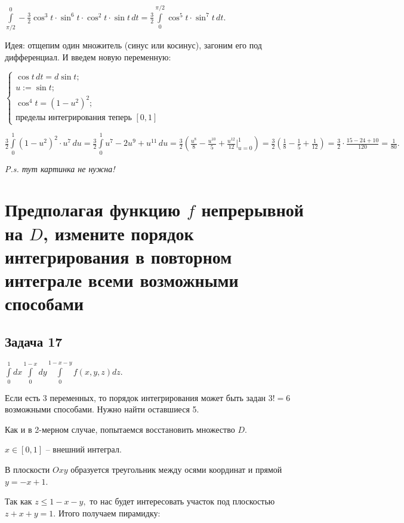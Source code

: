 \documentclass[a4paper, fleqn]{article}
\begin{document}
     $\int\limits_{\pi/2}^{0} -\frac{3}{2} \cos^3 t \cdot \sin^6 t \cdot \cos^2 t \cdot \sin t \, dt = \frac{3}{2} \int\limits_{0}^{\pi/ 2} \cos^5 t\cdot \sin^7 t \, dt.$
     
     Идея: отщепим один множитель (синус или косинус), загоним его под дифференциал. И введем новую переменную:
     
     $\begin{cases}
     \cos t \,dt = d \sin t;\\
     u := \sin t;\\
     \cos ^ 4 t = (1 - u^2)^2;\\
     \text{пределы интегрирования теперь } [0, 1]
     \end{cases}$
    
    $\frac{3}{2} \int\limits_{0}^{1} (1 - u^2)^2 \cdot u^7 \, du = \frac{3}{2} \int\limits_{0}^{1} u^7 - 2 u^9 + u^{11} \, du = \frac{3}{2} \left( \frac{u^8}{8} - \frac{u^{10}}{5} + \frac{u^{12}}{12} \Bigg|_{u = 0}^{1}\right) = \frac{3}{2} \left(\frac{1}{8} - \frac{1}{5} + \frac{1}{12}\right) = \frac{3}{2} \cdot \frac{15 - 24 + 10}{120} = \frac{1}{80}.$
    
    \textit{P.s. тут картинка не нужна!}
    
    
    \section*{Предполагая функцию $f$ непрерывной на $D$, измените порядок интегрирования в повторном интеграле
    всеми возможными способами}
    
    \subsection*{Задача 17}
    
    $\int\limits_{0}^{1} dx \int\limits_{0}^{1 - x} dy \int\limits_{0}^{1 - x - y} f(x, y, z) dz.$
    
    Если есть 3 переменных, то порядок интегрирования может быть задан $3! = 6$ возможными способами. Нужно найти оставшиеся 5.
    
    Как и в 2-мерном случае, попытаемся восстановить множество $D$.
    
    $x \in [0,1]$ -- внешний интеграл.
    
    В плоскости $Oxy$ образуется треугольник между осями координат и прямой $y = -x + 1.$ 
    
    Так как $z \leq 1 - x - y,$ то нас будет интересовать участок под плоскостью $z + x + y = 1.$ Итого получаем пирамидку:
    
\end{document}
